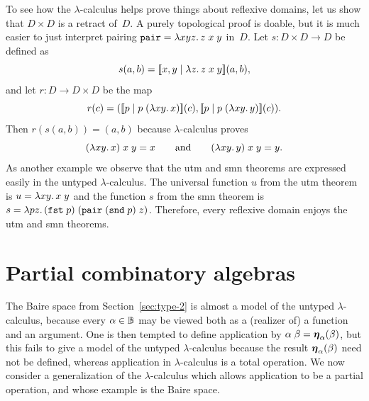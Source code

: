 To see how the $\lambda$-calculus helps prove things about reflexive
domains, let us show that $D \times D$ is a retract of~$D$. A purely
topological proof is doable, but it is much easier to just interpret
pairing $\mathtt{pair} = \lambda x y z .\,z\;x\;y$ in~$D$. Let $s : D
\times D \to D$ be defined as
%
\begin{equation*}
  s (a, b) = [\![x,y \mid \lambda z .\,z\;x\;y]\!](a,b),
\end{equation*}
%
and let $r : D \to D \times D$ be the map
%
\begin{equation*}
  r(c) = ([\![p \mid p\;(\lambda x y .\,x)]\!](c),
          [\![p \mid p\;(\lambda x y .\,y)]\!](c)).
\end{equation*}
%
Then $r (s (a, b)) = (a, b)$ because $\lambda$-calculus proves
%
\begin{equation*}
  (\lambda x y .\,x)\; x \; y = x
  \qquad\text{and}\qquad
  (\lambda x y .\,y)\; x \; y = y.
\end{equation*}
%
As another example we observe that the utm and smn theorems are
expressed easily in the untyped $\lambda$-calculus. The universal
function $u$ from the utm theorem is $u = \lambda x y .\,x\; y$ and the
function $s$ from the smn theorem is $s = \lambda p
  z .\,(\mathtt{fst}\;p)\;(\mathtt{pair}\;(\mathtt{snd}\; p)\;z)$.
Therefore, every reflexive domain enjoys the utm and smn theorems.


\section{Partial combinatory algebras}
\label{sec:pcas}

The Baire space from Section~\ref{sec:type-2} is almost a model of the
untyped $\lambda$-calculus, because every $\alpha \in \mathbb{B}$ may be
viewed both as a (realizer of) a function and an argument. One is then
tempted to define application by $\alpha \; \beta =
\text{\boldmath{$\eta$}}_{\alpha}(\beta)$, but this fails to give a model of the untyped
$\lambda$-calculus because the result $\text{\boldmath{$\eta$}}_{\alpha}(\beta)$ need not
be defined, whereas application in $\lambda$-calculus is a total
operation. We now consider a generalization of the $\lambda$-calculus
which allows application to be a partial operation, and whose example
is the Baire space.

